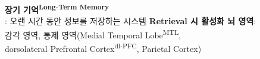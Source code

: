 \documentclass{beamer}
\begin{document}
\begin{frame}{\textbf{장기 기억\textsuperscript{Long-Term Memory}}\\\large{: 오랜 시간 동안 정보를 저장하는 시스템}}
  \vspace{-2em}
  \textbf{Retrieval 시 활성화 뇌 영역}:\\
  감각 영역, 통제 영역(Medial Temporal Lobe\textsuperscript{MTL}, \\\qquad dorsolateral Prefrontal Cortex\textsuperscript{dl-PFC}, Parietal Cortex)
  \vspace{-3.5em}


\end{frame}
\end{document}
